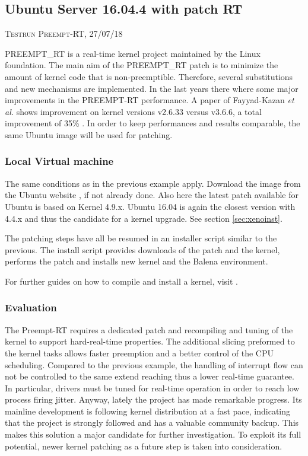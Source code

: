 \documentclass[]{scrartcl}
\begin{document}
\subsection{Ubuntu Server 16.04.4 with patch RT}

{\small\textsc{Testrun Preempt-RT, 27/07/18} \bigskip}

PREEMPT\_RT is a real-time kernel project maintained by the Linux foundation. 
The main aim of the PREEMPT\_RT patch is to minimize the amount of kernel code that is non-preemptible. Therefore, several substitutions and new mechanisms are implemented.
In the last years there where some major improvements in the PREEMPT-RT performance. A paper of Fayyad-Kazan \textit{et al.} shows improvement on kernel versions v2.6.33 versus v3.6.6, a total improvement of 35\% \cite{Fayyad-Kazanetal2014}. In order to keep performances and results comparable, the same Ubuntu image will be used for patching.

\subsubsection{Local Virtual machine}

The same conditions as in the previous example apply. Download the image from the Ubuntu website \cite{ubuntu02}, if not already done. Also here the latest patch available for Ubuntu is based on Kernel 4.9.x. Ubuntu 16.04 is again the closest version with 4.4.x and thus the candidate for a kernel upgrade. See section \ref{sec:xenoinst}.

The patching steps have all be resumed in an installer script similar to the previous. The install script provides downloads of the patch and the kernel, performs the patch and installs new kernel and the Balena environment.

For further guides on how to compile and install a kernel, visit \cite{misc01}.

\subsubsection{Evaluation}

The Preempt-RT requires a dedicated patch and recompiling and tuning of the kernel to support hard-real-time properties. The additional slicing preformed to the kernel tasks allows faster preemption and a better control of the CPU scheduling. Compared to the previous example, the handling of interrupt flow can not be controlled to the same extend reaching thus a lower real-time guarantee. In particular, drivers must be tuned for real-time operation in order to reach low process firing jitter. Anyway, lately the project has made remarkable progress.
Its mainline development is following kernel distribution at a fast pace, indicating that the project is strongly followed and has a valuable community backup. This makes this solution a major candidate for further investigation.
To exploit its full potential, newer kernel patching as a future step is taken into consideration.
\end{document}
